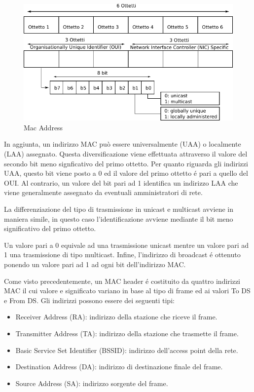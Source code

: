 \begin{figure}[!htb]
	\centering
	\includegraphics{images/img7.pdf}
	\caption{Mac Address}
	\label{fig:macaddress}
\end{figure}

In aggiunta, un indirizzo MAC pu\`o essere universalmente (UAA) o localmente (LAA) assegnato.
Questa diversificazione viene effettuata attraverso il valore del secondo bit meno signficativo del primo ottetto.
Per quanto riguarda gli indirizzi UAA, questo bit viene posto a 0 ed il valore del primo ottetto \'e pari a quello del OUI.
Al contrario, un valore del bit pari ad 1 identifica un indirizzo LAA che viene generalmente assegnato da eventuali amministratori di rete.

La differenziazione del tipo di trasmissione in unicast e multicast avviene in maniera simile, in questo caso l'identificazione avviene mediante il bit meno significativo del primo ottetto.

Un valore pari a 0 equivale ad una trasmissione unicast mentre un valore pari ad 1 una trasmissione di tipo multicast.
Infine, l'indirizzo di broadcast \'e ottenuto ponendo un valore pari ad 1 ad ogni bit dell'indirizzo MAC.

Come visto precedentemente, un MAC header \'e costituito da quattro indirizzi MAC il cui valore e significato variano in base al tipo di frame ed ai valori To DS e From DS.
Gli indirizzi possono essere dei seguenti tipi:
\begin{itemize}
	\item Receiver Address (RA): indirizzo della stazione che riceve il frame.
	\item Transmitter Address (TA): indirizzo della stazione che trasmette il frame.
	\item Basic Service Set Identifier (BSSID): indirizzo dell'access point della rete.
	\item Destination Address (DA): indirizzo di destinazione finale del frame.
	\item Source Address (SA): indirizzo sorgente del frame.
\end{itemize}

